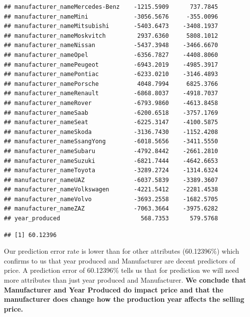 \documentclass[
]{article}
\newenvironment{Shaded}{\begin{snugshade}}{\end{snugshade}}
\newcommand{\DecValTok}[1]{\textcolor[rgb]{0.00,0.00,0.81}{#1}}
\newcommand{\FunctionTok}[1]{\textcolor[rgb]{0.00,0.00,0.00}{#1}}
\newcommand{\NormalTok}[1]{#1}
\newcommand{\SpecialCharTok}[1]{\textcolor[rgb]{0.00,0.00,0.00}{#1}}
\begin{document}
\begin{verbatim}
## manufacturer_nameMercedes-Benz    -1215.5909      737.7845
## manufacturer_nameMini             -3056.5676     -355.0096
## manufacturer_nameMitsubishi       -5403.6473    -3408.1937
## manufacturer_nameMoskvitch         2937.6360     5808.1012
## manufacturer_nameNissan           -5437.3948    -3466.6670
## manufacturer_nameOpel             -6356.7827    -4408.8060
## manufacturer_namePeugeot          -6943.2019    -4985.3917
## manufacturer_namePontiac          -6233.0210    -3146.4893
## manufacturer_namePorsche           4048.7994     6825.3766
## manufacturer_nameRenault          -6868.8037    -4918.7037
## manufacturer_nameRover            -6793.9860    -4613.8458
## manufacturer_nameSaab             -6200.6518    -3757.1769
## manufacturer_nameSeat             -6225.3147    -4100.5875
## manufacturer_nameSkoda            -3136.7430    -1152.4208
## manufacturer_nameSsangYong        -6018.5656    -3411.5550
## manufacturer_nameSubaru           -4792.8442    -2661.2810
## manufacturer_nameSuzuki           -6821.7444    -4642.6653
## manufacturer_nameToyota           -3289.2724    -1314.6324
## manufacturer_nameUAZ              -6037.5839    -3389.3607
## manufacturer_nameVolkswagen       -4221.5412    -2281.4538
## manufacturer_nameVolvo            -3693.2558    -1682.5705
## manufacturer_nameZAZ              -7063.3664    -3975.6282
## year_produced                       568.7353      579.5768
\end{verbatim}

\begin{Shaded}
\end{Shaded}

\begin{verbatim}
## [1] 60.12396
\end{verbatim}

Our prediction error rate is lower than for other attributes
(60.12396\%) which confirms to us that year produced and Manufacturer
are decent predictors of price. A prediction error of 60.12396\% tells
us that for prediction we will need more attributes than just year
produced and Manufacturer. \textbf{We conclude that Manufacturer and
Year Produced do impact price and that the manufacturer does change how
the production year affects the selling price.}
\end{document}
